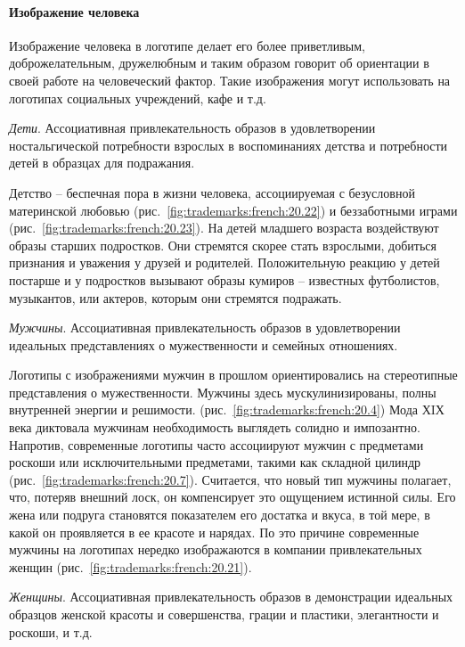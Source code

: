   \paragraph{Изображение человека}

  Изображение человека в логотипе делает его более приветливым, доброжелательным, дружелюбным и таким образом говорит об ориентации в своей работе на человеческий фактор. Такие изображения могут использовать на
    логотипах социальных учреждений, кафе и т.д.

     \emph{Дети}. Ассоциативная привлекательность образов в удовлетворении
      ностальгической потребности взрослых в воспоминаниях детства и потребности детей
      в образцах для подражания.

      Детство -- беспечная пора в жизни человека, ассоциируемая с безусловной
      материнской любовью (рис.~\ref{fig:trademarks:french:20.22}) и беззаботными
      играми (рис.~\ref{fig:trademarks:french:20.23}). На детей младшего возраста
      воздействуют образы старших подростков. Они стремятся скорее стать взрослыми,
      добиться признания и уважения у друзей и родителей. Положительную реакцию у
      детей постарше и у подростков вызывают образы кумиров -- известных футболистов,
      музыкантов, или актеров, которым они стремятся подражать.

   \emph{Мужчины}. Ассоциативная привлекательность образов в удовлетворении
      идеальных представлениях о мужественности и семейных отношениях.

      Логотипы с изображениями мужчин в прошлом ориентировались на стереотипные
      представления о мужественности. Мужчины здесь мускулинизированы, полны
      внутренней энергии и решимости. (рис.~\ref{fig:trademarks:french:20.4})
      Мода ХIХ века диктовала мужчинам необходимость выглядеть солидно и
      импозантно. Напротив, современные логотипы часто ассоциируют мужчин с
      предметами роскоши или исключительными предметами, такими как складной
      цилиндр (рис.~\ref{fig:trademarks:french:20.7}). Считается, что новый тип
      мужчины полагает, что, потеряв внешний лоск, он компенсирует это ощущением
      истинной силы. Его жена или подруга становятся показателем его достатка и
      вкуса, в той мере, в какой он проявляется в ее красоте и нарядах. По это
      причине современные мужчины на логотипах нередко изображаются в компании
      привлекательных женщин (рис.~\ref{fig:trademarks:french:20.21}).

  \emph{Женщины}. Ассоциативная привлекательность образов в демонстрации
      идеальных образцов женской красоты и совершенства, грации и пластики,
      элегантности и роскоши, и т.д.

